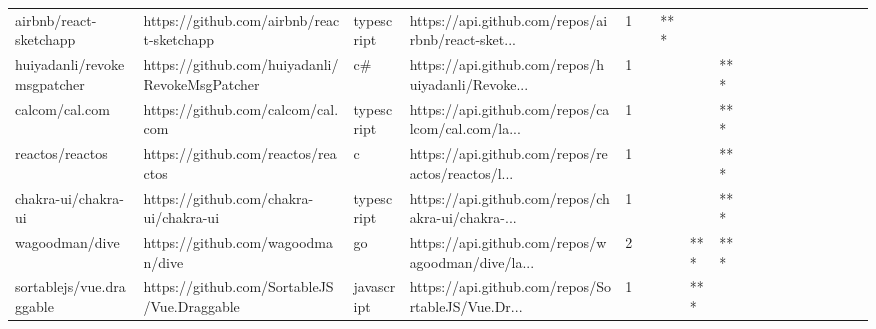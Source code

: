 \begin{tabular}{llllrlllllllllllll}
airbnb/react-sketchapp                             &          https://github.com/airbnb/react-sketchapp &        typescript &  https://api.github.com/repos/airbnb/react-sket... &       1 &         &    *** &           &                &                 &        &           &           &          &          &       &              &          \\
huiyadanli/revokemsgpatcher                        &     https://github.com/huiyadanli/RevokeMsgPatcher &                c\# &  https://api.github.com/repos/huiyadanli/Revoke... &       1 &         &        &           &            *** &                 &        &           &           &          &          &       &              &          \\
calcom/cal.com                                     &                  https://github.com/calcom/cal.com &        typescript &  https://api.github.com/repos/calcom/cal.com/la... &       1 &         &        &           &            *** &                 &        &           &           &          &          &       &              &          \\
reactos/reactos                                    &                 https://github.com/reactos/reactos &                 c &  https://api.github.com/repos/reactos/reactos/l... &       1 &         &        &           &            *** &                 &        &           &           &          &          &       &              &          \\
chakra-ui/chakra-ui                                &             https://github.com/chakra-ui/chakra-ui &        typescript &  https://api.github.com/repos/chakra-ui/chakra-... &       1 &         &        &           &            *** &                 &        &           &           &          &          &       &              &          \\
wagoodman/dive                                     &                  https://github.com/wagoodman/dive &                go &  https://api.github.com/repos/wagoodman/dive/la... &       2 &         &        &       *** &            *** &                 &        &           &           &          &          &       &              &          \\
sortablejs/vue.draggable                           &        https://github.com/SortableJS/Vue.Draggable &        javascript &  https://api.github.com/repos/SortableJS/Vue.Dr... &       1 &         &        &       *** &                &                 &        &           &           &          &          &       &              &          \\

\end{tabular}
